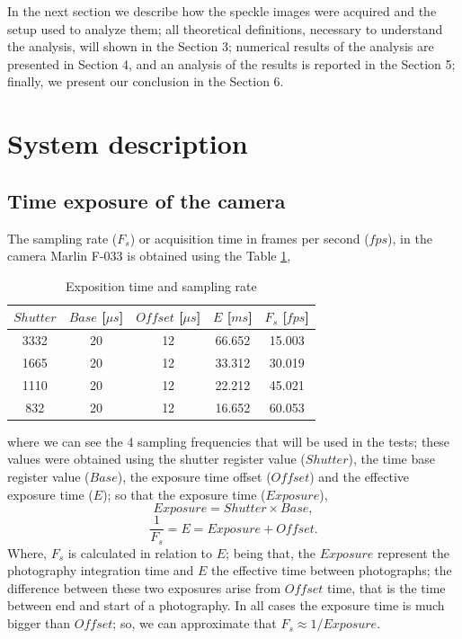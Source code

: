 \documentclass[review]{elsarticle}
\begin{document}
In the next section we describe how the speckle images were acquired and the setup used to analyze them; 
all theoretical definitions, necessary to understand the analysis, will shown in the Section 3;
numerical results of the analysis  are presented in Section 4, and
an analysis of the results is reported in the Section 5; finally, we present our
conclusion in the Section 6.

\section{System description}
\label{sec:description}




\subsection{Time exposure of the camera}
\label{subsec:expositiontime}
The sampling rate ($F_s$) or acquisition time in frames per second ($fps$), 
in the camera Marlin F-033 is obtained using the 
 Table \ref{table:1}, 
\begin{table}[h!]
\centering
\begin{tabular}{||c c c c c||} 
 \hline
 $Shutter$ &  $Base$ [$\mu s$] & $Offset$ [$\mu s$] & $E$ [$ms$] & $F_s$ [$fps$]\\ [0.5ex] 
 \hline\hline
 3332  & 20  & 12  & 66.652  & 15.003  \\ 
 1665  & 20  & 12  & 33.312  & 30.019  \\ 
 1110  & 20  & 12  & 22.212  & 45.021  \\ 
 832   & 20  & 12  & 16.652  & 60.053  \\ [1ex] 
 \hline
\end{tabular}
\caption{Exposition time and sampling rate}
\label{table:1}
\end{table}
where we can see the 4 sampling frequencies that will be used in the tests;
these values were obtained using  
the shutter register value ($Shutter$), 
the time base register value ($Base$),
the exposure time offset ($Offset$) and
the effective exposure time ($E$);
 so that the exposure time ($Exposure$),
\begin{equation}
Exposure= Shutter \times Base,
\end{equation}
\begin{equation}
\frac{1}{F_s}=E= Exposure + Offset.
\end{equation}
Where,  $F_s$ is calculated in relation to $E$; being that,
the $Exposure$ represent the photography integration time and $E$ the effective time
between photographs; 
the difference between these two exposures arise from $Offset$ time, 
that is the time between end and start of a photography.
In all cases the exposure time is much bigger than $Offset$; so, we can approximate
that $F_s\approx 1/Exposure$.
\end{document}

